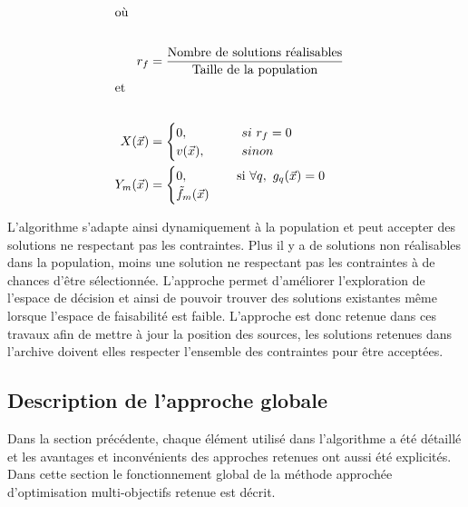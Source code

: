 \begin{align*}
  \shortintertext{où} \\
    r_{f} &= \frac{\text{Nombre de solutions réalisables}}{\text{Taille de la population}} \\
  \shortintertext{et} \\
  X(\vec{x})     &= \begin{cases}
                0,          \qquad     & si\  r_{f} = 0\\
                v(\vec{x}), \qquad     & sinon\\
                \end{cases} \\
  Y_{m}(\vec{x}) &= \begin{cases}
                    0,          \quad \qquad & \text{si} \ \forall q, \ g_{q}(\vec{x}) = 0\\
                      \tilde{f}_{m}(\vec{x})  \\
            \end{cases}\\
\end{align*}

L’algorithme s’adapte ainsi dynamiquement à la population et peut accepter des
solutions ne respectant pas les contraintes. Plus il y a de solutions non
réalisables dans la population, moins une solution ne respectant pas les contraintes à
de chances d’être sélectionnée. L’approche permet d’améliorer l’exploration de
l’espace de décision et ainsi de pouvoir trouver des solutions existantes même
lorsque l’espace de faisabilité est faible.
L’approche est donc retenue dans ces travaux afin de mettre à jour la position des
sources, les solutions retenues dans l’archive doivent elles respecter
l’ensemble des contraintes pour être acceptées.


\subsection{Description de l’approche globale} %
\label{sub:description_de_l_approche_globale}
Dans la section précédente, chaque élément utilisé dans l’algorithme a été détaillé et
les avantages et inconvénients des approches retenues ont aussi été explicités.
Dans cette section le fonctionnement global de la méthode approchée d’optimisation
multi-objectifs retenue est décrit.

